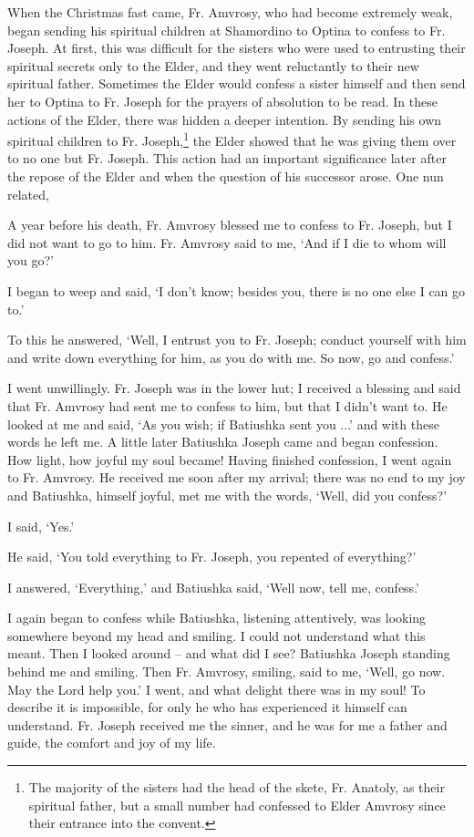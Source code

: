 When the Christmas fast came, Fr. Amvrosy, who had become extremely weak, began sending his spiritual children at Shamordino to Optina to confess to Fr. Joseph. At first, this was difficult for the sisters who were used to entrusting their spiritual secrets only to the Elder, and they went reluctantly to their new spiritual father. Sometimes the Elder would confess a sister himself and then send her to Optina to Fr. Joseph for the prayers of absolution to be read. In these actions of the Elder, there was hidden a deeper intention. By sending his own spiritual children to Fr. Joseph,\footnote{The majority of the sisters had the head of the skete, Fr. Anatoly, as their spiritual father, but a small number had confessed to Elder Amvrosy since their entrance into the convent.} the Elder showed that he was giving them over to no one but Fr. Joseph. This action had an important significance later after the repose of the Elder and when the question of his successor arose.
One nun related, \\

\begin{adjustwidth}{2em}{2em}

A year before his death, Fr. Amvrosy blessed me to confess to Fr. Joseph, but I did not want to go to him. Fr. Amvrosy said to me, `And if I die to whom will you go?'

I began to weep and said, `I don't know; besides you, there is no one else I can go to.'

To this he answered, `Well, I entrust you to Fr. Joseph; conduct yourself with him and write down everything for him, as you do with me. So now, go and confess.'

I went unwillingly. Fr. Joseph was in the lower hut; I received a blessing and said that Fr. Amvrosy had sent me to confess to him, but that I didn't want to. He looked at me and said, `As you wish; if Batiushka sent you ...' and with these words he left me. A little later Batiushka Joseph came and began confession. How light, how joyful my soul became! Having finished confession, I went again to Fr. Amvrosy. He received me soon after my arrival; there was no end to my joy and Batiushka, himself joyful, met me with the words, `Well, did you confess?'

I said, `Yes.'

He said, `You told everything to Fr. Joseph, you repented of everything?'

I answered, `Everything,' and Batiushka said, `Well now, tell me, confess.'

I again began to confess while Batiushka, listening attentively, was looking somewhere beyond my head and smiling. I could not understand what this meant. Then I looked around -- and what did I see? Batiushka Joseph standing behind me and smiling. Then Fr. Amvrosy, smiling, said to me, `Well, go now. May the Lord help you.' I went, and what delight there was in my soul! To describe it is impossible, for only he who has experienced it himself can understand. Fr. Joseph received me the sinner, and he was for me a father and guide, the comfort and joy of my life.

\end{adjustwidth}

